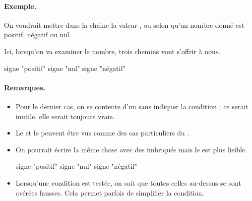 	\begin{Emphase}
		\paragraph{Exemple.}
		On voudrait mettre dans la chaine 
		la valeur , 
		ou 
		selon qu'un nombre donné est positif, négatif ou nul.
		
		Ici, lorsqu'on va examiner le nombre, 
		trois chemins vont s'offrir à nous.

		\begin{minipage}{9cm}
		\end{minipage}
		\quad
		\begin{minipage}{4cm}
			\begin{LDA}
					\Let signe \Gets "positif"
					\Let signe \Gets "nul"
				\Else
					\Let signe \Gets "négatif"
				\EndIf
			\end{LDA}
		\end{minipage}
	\end{Emphase}
		
	\paragraph{Remarques.}
	\begin{itemize}
	\item
		Pour le dernier cas, on se contente
		d'un  sans indiquer la condition ;
		ce serait inutile, elle serait toujours vraie.
	\item
		Le  et le \lda{\K{si-sinon}} 
		peuvent être vus comme des cas particuliers du 
		\lda{\K{si-sinon-si}}.
	\item
		On pourrait écrire la même chose 
		avec des  imbriqués
		mais le  est plus lisible.
		\begin{LDA}
			\If{nb>0}
				\Let signe \Gets "positif"
			\Else
				\If{nb=0}
					\Let signe \Gets "nul"
				\Else
					\Let signe \Gets "négatif"
				\EndIf
			\EndIf
		\end{LDA}
		\medskip
	\item
		Lorsqu'une condition est testée,
		on sait que toutes celles au-dessus
		se sont avérées fausses.
		Cela permet parfois de simplifier la condition.
	\end{itemize}

